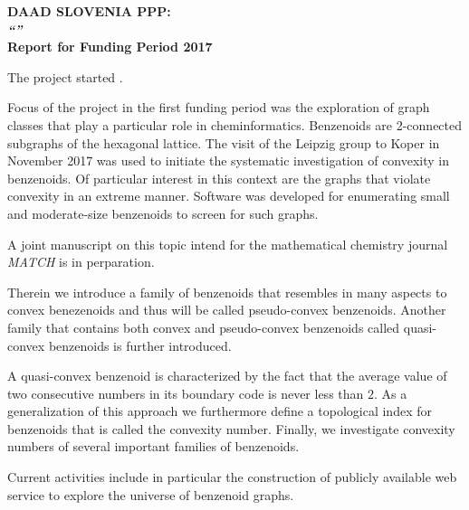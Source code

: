 \documentclass{article}
\begin{document}
 

\par\noindent\textbf{\large DAAD SLOVENIA PPP:\\[1em]
  \emph{``''}\\[1.0em]
  Report for Funding Period 2017}

The project started . 

Focus of the project in the first funding period was the exploration of
graph classes that play a particular role in cheminformatics. Benzenoids
are 2-connected subgraphs of the hexagonal lattice. The visit of the
Leipzig group to Koper in November 2017 was used to initiate the systematic
investigation of convexity in benzenoids. Of particular interest in this
context are the graphs that violate convexity in an extreme manner. Software
was developed for enumerating small and moderate-size benzenoids to screen
for such graphs. 


A joint manuscript on this topic intend for the mathematical chemistry
journal \emph{MATCH} is in perparation.

Therein we introduce a family of benzenoids that
resembles in many aspects to convex benezenoids and thus will be called pseudo-convex
benzenoids. Another family that contains both convex and pseudo-convex benzenoids called 
quasi-convex benzenoids is further introduced. 

A quasi-convex benzenoid is characterized by the fact that the average value of two consecutive 
numbers in its boundary code is never less than $2$. As a generalization of this approach we 
furthermore define a topological index for benzenoids that is called the convexity number. Finally, 
we investigate convexity numbers of several important families of benzenoids.

Current activities include in particular the construction of publicly
available web service to explore the universe of benzenoid graphs. 
\end{document}
